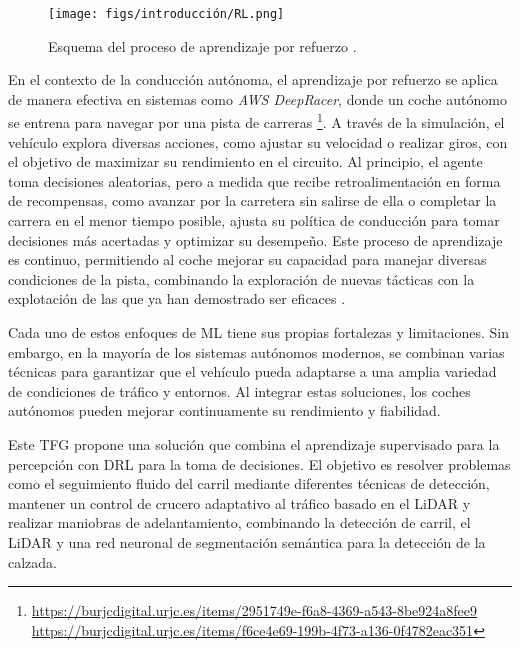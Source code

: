 \begin{figure}[ht]
\begin{center}
\texttt{[image: figs/introducción/RL.png]}
\end{center}
\caption{Esquema del proceso de aprendizaje por refuerzo \cite{reinforcement-learning-schema}.}
\label{rl}
\end{figure}

En el contexto de la conducción autónoma, el aprendizaje por refuerzo se aplica de manera efectiva en sistemas como \textit{AWS DeepRacer}, donde un coche autónomo se entrena para navegar por una pista de carreras \footnote{\url{https://burjcdigital.urjc.es/items/2951749e-f6a8-4369-a543-8be924a8fee9}\\ \url{ https://burjcdigital.urjc.es/items/f6ce4e69-199b-4f73-a136-0f4782eac351}}. A través de la simulación, el vehículo explora diversas acciones, como ajustar su velocidad o realizar giros, con el objetivo de maximizar su rendimiento en el circuito. Al principio, el agente toma decisiones aleatorias, pero a medida que recibe retroalimentación en forma de recompensas, como avanzar por la carretera sin salirse de ella o completar la carrera en el menor tiempo posible, ajusta su política de conducción para tomar decisiones más acertadas y optimizar su desempeño. Este proceso de aprendizaje es continuo, permitiendo al coche mejorar su capacidad para manejar diversas condiciones de la pista, combinando la exploración de nuevas tácticas con la explotación de las que ya han demostrado ser eficaces \cite{aws-deep-racer}.

Cada uno de estos enfoques de \ac{ML} tiene sus propias fortalezas y limitaciones. Sin embargo, en la mayoría de los sistemas autónomos modernos, se combinan varias técnicas para garantizar que el vehículo pueda adaptarse a una amplia variedad de condiciones de tráfico y entornos. Al integrar estas soluciones, los coches autónomos pueden mejorar continuamente su rendimiento y fiabilidad.

Este \ac{TFG} propone una solución que combina el aprendizaje supervisado para la percepción con \ac{DRL} para la toma de decisiones. El objetivo es resolver problemas como el seguimiento fluido del carril mediante diferentes técnicas de detección, mantener un control de crucero adaptativo al tráfico basado en el \ac{LiDAR} y realizar maniobras de adelantamiento, combinando la detección de carril, el \ac{LiDAR} y una red neuronal de segmentación semántica para la detección de la calzada. 


